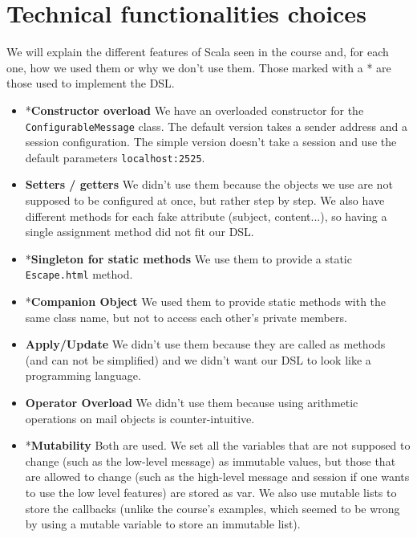 \documentclass[10pt,a4paper]{article}
\begin{document}
\clearpage
	
\section{Technical functionalities choices}

	We will explain the different features of Scala seen in the course and, for each one, how we used them or why we don't use them. Those marked with a * are those used to implement the DSL.

	\begin{itemize}
		\item *\textbf{Constructor overload} We have an overloaded constructor for the \texttt{ConfigurableMessage} class. The default version takes a sender address and a session configuration. The simple version doesn't take a session and use the default parameters \texttt{localhost:2525}.
		
		\item \textbf{Setters / getters} We didn't use them because the objects we use are not supposed to be configured at once, but rather step by step. We also have different methods for each fake attribute (subject, content...), so having a single assignment method did not fit our DSL.
		
		\item *\textbf{Singleton for static methods} We use them to provide a static \texttt{Escape.html} method.
		
		\item *\textbf{Companion Object} We used them to provide static methods with the same class name, but not to access each other's private members.
		
		\item \textbf{Apply/Update} We didn't use them because they are called as methods (and can not be simplified) and we didn't want our DSL to look like a programming language.
		
		\item \textbf{Operator Overload} We didn't use them because using arithmetic operations on mail objects is counter-intuitive.
		
		\item *\textbf{Mutability} Both are used. We set all the variables that are not supposed to change (such as the low-level message) as immutable values, but those that are allowed to change (such as the high-level message and session if one wants to use the low level features) are stored as var. We also use mutable lists to store the callbacks (unlike the course's examples, which seemed to be wrong by using a mutable variable to store an immutable list).
		

\end{itemize}
\end{document}

